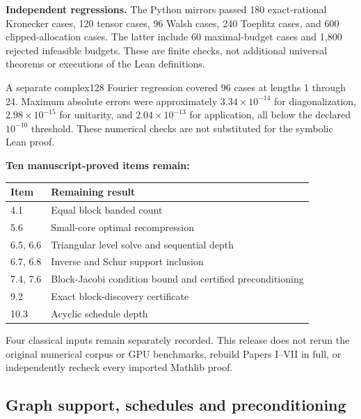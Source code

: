 \textbf{Independent regressions.} The Python mirrors passed 180 exact-rational Kronecker cases, 120 tensor cases, 96 Walsh cases, 240 Toeplitz cases, and 600 clipped-allocation cases. The latter include 60 maximal-budget cases and 1,800 rejected infeasible budgets. These are finite checks, not additional universal theorems or executions of the Lean definitions.

A separate complex128 Fourier regression covered 96 cases at lengths 1 through 24. Maximum absolute errors were approximately $3.34\times10^{-14}$ for diagonalization, $2.98\times10^{-15}$ for unitarity, and $2.04\times10^{-13}$ for application, all below the declared $10^{-10}$ threshold. These numerical checks are not substituted for the symbolic Lean proof.

\textbf{Ten manuscript-proved items remain:}
\begin{center}\small
\begin{tabular}{@{}lp{}@{}}
\toprule
Item & Remaining result\\\midrule
4.1 & Equal block banded count\\
5.6 & Small-core optimal recompression\\
6.5, 6.6 & Triangular level solve and sequential depth\\
6.7, 6.8 & Inverse and Schur support inclusion\\
7.4, 7.6 & Block-Jacobi condition bound and certified preconditioning\\
9.2 & Exact block-discovery certificate\\
10.3 & Acyclic schedule depth\\\bottomrule
\end{tabular}
\end{center}
Four classical inputs remain separately recorded. This release does not rerun the original numerical corpus or GPU benchmarks, rebuild Papers I--VII in full, or independently recheck every imported Mathlib proof.



\subsection{Graph support, schedules and preconditioning}\label{sec:history-5}


